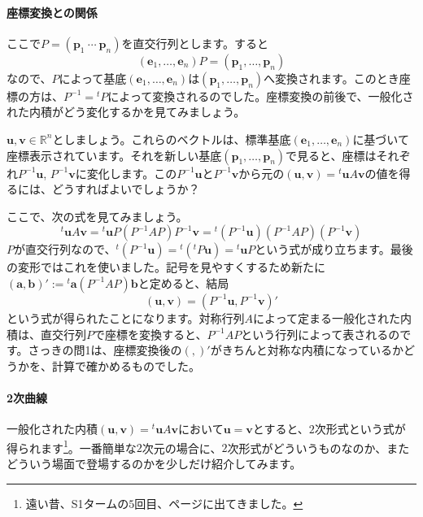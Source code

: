 \paragraph{座標変換との関係}

ここで$P = (\bm{p}_1 \ \cdots \ \bm{p}_n)$を直交行列とします。すると
\[
(\bm{e}_1, \ldots, \bm{e}_n) P = (\bm{p}_1, \ldots, \bm{p}_n)
\]
なので、$P$によって基底$(\bm{e}_1, \ldots, \bm{e}_n)$は$(\bm{p}_1, \ldots, \bm{p}_n)$へ変換されます。このとき座標の方は、$P^{-1} = {}^tP$によって変換されるのでした。座標変換の前後で、一般化された内積がどう変化するかを見てみましょう。

$\bm{u}, \bm{v} \in \mathbb{R}^n$としましょう。これらのベクトルは、標準基底$(\bm{e}_1, \ldots, \bm{e}_n)$に基づいて座標表示されています。それを新しい基底$(\bm{p}_1, \ldots, \bm{p}_n)$で見ると、座標はそれぞれ$P^{-1} \bm{u}$, $P^{-1} \bm{v}$に変化します。この$P^{-1}\bm{u}$と$P^{-1}\bm{v}$から元の$(\bm{u}, \bm{v}) = {}^t\bm{u} A \bm{v}$の値を得るには、どうすればよいでしょうか？

ここで、次の式を見てみましょう。
\[
{}^t\bm{u} A \bm{v} = {}^t\bm{u}P (P^{-1} A P) P^{-1}\bm{v} = {}^t(P^{-1} \bm{u}) (P^{-1} A P) (P^{-1} \bm{v})
\]
$P$が直交行列なので、${}^t(P^{-1}\bm{u}) = {}^t({}^tP \bm{u}) = {}^t\bm{u} P$という式が成り立ちます。最後の変形ではこれを使いました。記号を見やすくするため新たに$(\bm{a}, \bm{b})' := {}^t\bm{a} (P^{-1} A P) \bm{b}$と定めると、結局
\[
(\bm{u}, \bm{v}) = (P^{-1}\bm{u}, P^{-1}\bm{v})'
\]
という式が得られたことになります。対称行列$A$によって定まる一般化された内積は、直交行列$P$で座標を変換すると、$P^{-1} A P$という行列によって表されるのです。さっきの問1は、座標変換後の$(,)'$がきちんと対称な内積になっているかどうかを、計算で確かめるものでした。

\paragraph{2次曲線}

一般化された内積$(\bm{u}, \bm{v}) = {}^t\bm{u} A \bm{v}$において$\bm{u} = \bm{v}$とすると、$2$次形式という式が得られます\footnote{遠い昔、S1タームの$5$回目、\pageref{paragraph:example_of_inner_product}ページに出てきました。}。一番簡単な$2$次元の場合に、$2$次形式がどういうものなのか、またどういう場面で登場するのかを少しだけ紹介してみます。

